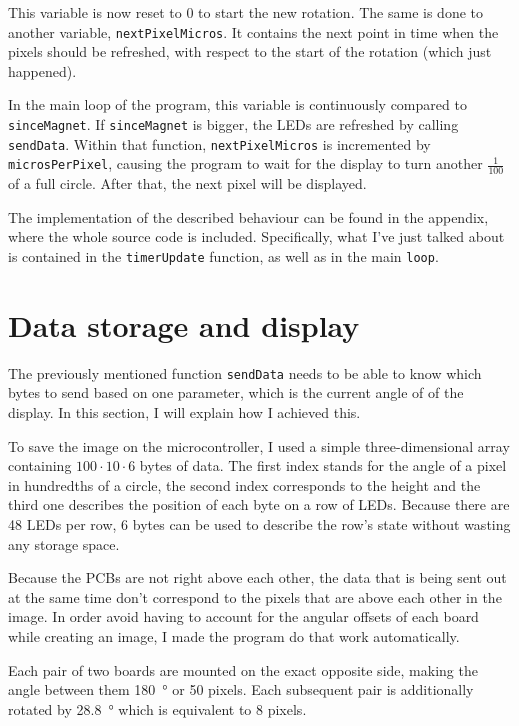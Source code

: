\documentclass[a4paper, 11pt, titlepage]{report}
\begin{document}
This variable is now reset to 0 to start the new rotation. The same is done to another
variable, \texttt{nextPixelMicros}. It contains the next point in time when the pixels
should be refreshed, with respect to the start of the rotation (which just happened).

In the main loop of the program, this variable is continuously compared to \texttt{sinceMagnet}.
If \texttt{sinceMagnet} is bigger, the LEDs are refreshed by calling \texttt{sendData}. Within
that function, \texttt{nextPixelMicros} is incremented by \texttt{microsPerPixel}, causing the
program to wait for the display to turn another $\frac{1}{100}$ of a full circle. After that, the
next pixel will be displayed.

The implementation of the described behaviour can be found in the appendix, where the whole source
code is included. Specifically, what I've just talked about is contained in the
\texttt{timerUpdate} function, as well as in the main \texttt{loop}.


\section{Data storage and display}

The previously mentioned function \texttt{sendData} needs to be able to know which bytes to send
based on one parameter, which is the current angle of of the display. In this section, I will
explain how I achieved this.

To save the image on the microcontroller, I used a simple three-dimensional array containing $100
\cdot 10 \cdot 6$ bytes of data. The first index stands for the angle of a pixel in hundredths of
a circle, the second index corresponds to the height and the third one describes the position of
each byte on a row of LEDs. Because there are 48 LEDs per row, 6 bytes can be used to describe the
row's state without wasting any storage space. 

Because the PCBs are not right above each other, the data that is being sent out at the same time
don't correspond to the pixels that are above each other in the image. In order avoid having to
account for the angular offsets of each board while creating an image, I made the program do that
work automatically.

Each pair of two boards are mounted on the exact opposite side, making the angle between them
\SI{180}{\degree} or 50 pixels. Each subsequent pair is additionally rotated by \SI{28.8}{\degree}
which is equivalent to 8 pixels.
\end{document}

